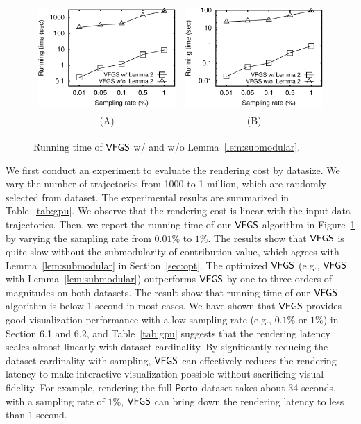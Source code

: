 \begin{figure}
 \centering
 \small
 \begin{tabular}{cc}
   \includegraphics[width=0.44\columnwidth]{pictures/tporto}
   &
   \includegraphics[width=0.44\columnwidth]{pictures/tshenzhen}
   \\
   (A) \pt{}
   &
   (B) \sz{}	
 \end{tabular}
 \vspace{-3mm}
 \caption{Running time of $\mathsf{VFGS}$ w/ and w/o Lemma~\ref{lem:submodular}.}
 \label{fig:cost}
 \vspace{-3mm}
\end{figure}


We first conduct an experiment to evaluate the rendering cost by datasize. We vary the number of trajectories from 1000 to 1 million, which are randomly selected from \pt{} dataset. The experimental results are summarized in Table~\ref{tab:gpu}. We observe that the rendering cost is linear with the input data trajectories.
Then, we report the running time of our $\mathsf{VFGS}$ algorithm in Figure~\ref{fig:cost} by varying the sampling rate from $0.01\%$ to $1\%$. The results show that $\mathsf{VFGS}$ is quite slow without the submodularity of contribution value, which agrees with Lemma~\ref{lem:submodular} in Section~\ref{sec:opt}.
The optimized $\mathsf{VFGS}$ (e.g., $\mathsf{VFGS}$ with Lemma~\ref{lem:submodular}) outperforms $\mathsf{VFGS}$ by one to three orders of magnitudes on both datasets. The result show that running time of our $\mathsf{VFGS}$ algorithm is below 1 second in most cases. We have shown that $\mathsf{VFGS}$ provides good visualization performance with a low sampling rate (e.g., $0.1\%$ or $1\%$) in Section 6.1 and 6.2,  and Table~\ref{tab:gpu} suggests that the rendering latency scales almost linearly with dataset cardinality. By significantly reducing the dataset cardinality with sampling, $\mathsf{VFGS}$ can effectively reduces the rendering latency to make interactive visualization possible without sacrificing visual fidelity. For example, rendering the full $\textsf{Porto}{}$ dataset takes about 34 seconds, with a sampling rate of $1\%$, $\mathsf{VFGS}$ can bring down the rendering latency to less than 1 second.


